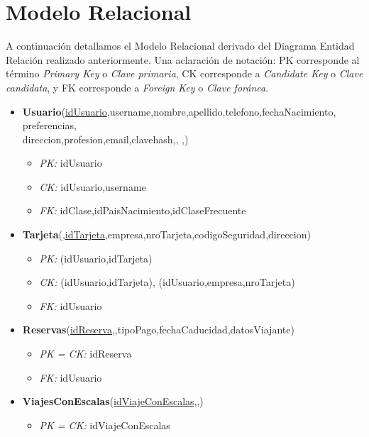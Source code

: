\section{Modelo Relacional}

A continuaci\'on detallamos el Modelo Relacional derivado del
Diagrama Entidad Relaci\'on realizado anteriormente. Una aclaraci\'on
de notaci\'on: PK corresponde al t\'ermino \textit{Primary Key} o \textit{Clave primaria},
CK corresponde a \textit{Candidate Key} o \textit{Clave candidata}, y FK corresponde a
\textit{Foreign Key} o \textit{Clave for\'anea}.

\begin{itemize}
	\item \textbf{Usuario}(\underline{idUsuario},username,nombre,apellido,telefono,fechaNacimiento,
	preferencias,\\ direccion,profesion,email,clavehash,,
	,)
		\begin{itemize}
			\item \textit{PK:} idUsuario
			\item \textit{CK:} idUsuario,username
			\item \textit{FK:} idClase,idPaisNacimiento,idClaseFrecuente
		\end{itemize}
	\item \textbf{Tarjeta}(\underline{,idTarjeta},empresa,nroTarjeta,codigoSeguridad,direccion)
		\begin{itemize}
			\item \textit{PK:} (idUsuario,idTarjeta)
			\item \textit{CK:} (idUsuario,idTarjeta), (idUsuario,empresa,nroTarjeta)
			\item \textit{FK:} idUsuario
		\end{itemize}
	\item \textbf{Reservas}(\underline{idReserva},,tipoPago,fechaCaducidad,datosViajante)
		\begin{itemize}
			\item \textit{PK = CK:} idReserva
			\item \textit{FK:} idUsuario
		\end{itemize}
	\item \textbf{ViajesConEscalas}(\underline{idViajeConEscalas},,)
		\begin{itemize}
			\item \textit{PK = CK:} idViajeConEscalas

\end{itemize}
\end{itemize}
